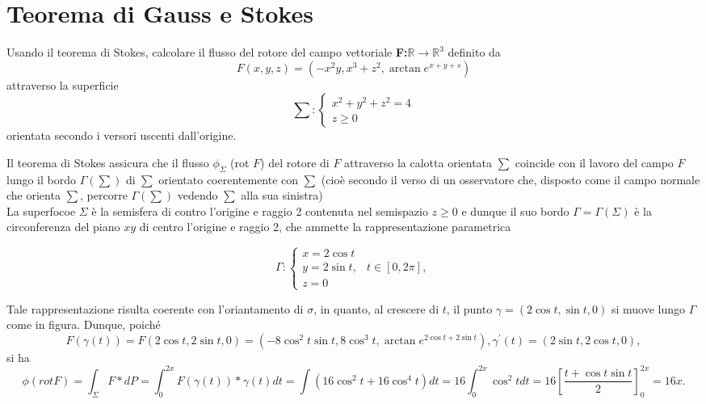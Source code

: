 \section{Teorema di Gauss e Stokes}
\begin{esercizio}
  Usando il teorema di Stokes, calcolare il flusso del rotore del campo vettoriale \textbf{F:}$\mathds{R}\to \mathds{R}^3$ definito da
  \begin{equation*}
	F(x,y,z)=\left(-x^2y, x^3+z^2,\arctan e^{x+y+s}\right)
  \end{equation*}
  attraverso la superficie
  \begin{equation*}
    \sum:\begin{cases}
           x^2+y^2+z^2=4\\
           z\geq 0
         \end{cases}
  \end{equation*}
  orientata secondo i versori uscenti dall'origine.
\end{esercizio}
\begin{svol}
  Il teorema di Stokes assicura che il flusso $\phi_\Sigma$ (rot $F$) del rotore di $F$ attraverso la calotta
  orientata $\sum$ coincide con il lavoro del campo $F$ lungo il bordo $\Gamma(\sum)$ di $\sum$ orientato
  coerentemente con $\sum$ (cioè secondo il verso di un osservatore che, disposto come il campo normale che
  orienta $\sum$, percorre $\Gamma(\sum)$ vedendo $\sum$ alla sua sinistra)\\
  La superfocoe $\Sigma$ è la semisfera di contro l'origine e raggio 2 contenuta nel semispazio $z\geq 0$ e
  dunque il suo bordo $\Gamma =\Gamma (\Sigma)$ è la circonferenza del piano $xy$ di centro l'origine e raggio 2,
  che ammette la rappresentazione parametrica
  \begin{multicols}{2}
    \begin{equation*}
      \Gamma:
      \begin{cases}
        x=2\cos t\\
        y=2\sin t, & t\in [0,2\pi],\\
        z=0
      \end{cases}
    \end{equation*}
  \end{multicols}
  Tale rappresentazione risulta coerente con l'oriantamento di $\sigma$, in quanto, al crescere di $t$,
  il punto $\gamma= (2\cos t, \sin t, 0)$ si muove lungo $\Gamma$ come in figura. Dunque, poiché
  \begin{equation*}
    F(\gamma(t))=F(2\cos t, 2\sin t,0)=(-8\cos^2t\sin t, 8\cos^3t, \arctan e^{2\cos t+2\sin t}),
    \gamma^\prime (t)=(2\sin t, 2\cos t, 0), 
  \end{equation*}
  si ha
  \begin{equation*}
    \phi(rot F)= \int_\Sigma F*dP=\int^{2x}_0F(\gamma(t)) *\gamma(t)dt=\int (16\cos^2t+16\cos^4t)dt =
    16\int^{2x}_{0}\cos^2tdt=16\left[\frac{t+\cos t \sin t}{2}\right]^{2x}_0=16x.
  \end{equation*}
\end{svol}
